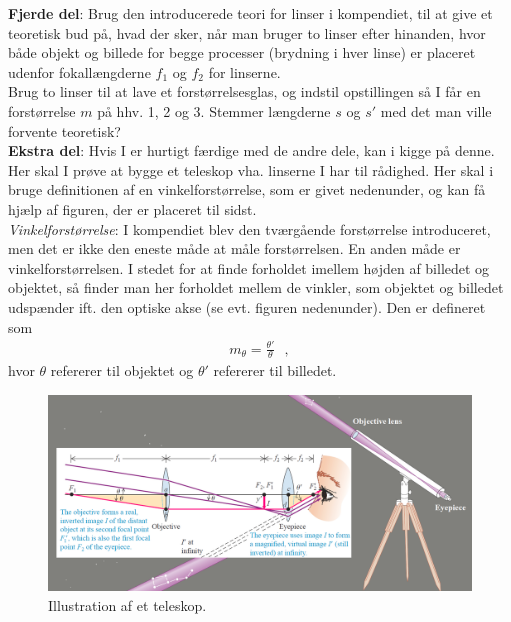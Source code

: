 \documentclass[a4paper,oneside,article,11pt]{memoir}
\begin{document}
\textbf{Fjerde del}:
Brug den introducerede teori for linser i kompendiet, til at give et teoretisk bud på, hvad der sker, når man bruger to linser efter hinanden, hvor både objekt og billede for begge processer (brydning i hver linse) er placeret udenfor fokallængderne $f_1$ og $f_2$ for linserne.\\ 
Brug to linser til at lave et forstørrelsesglas, og indstil opstillingen så I får en forstørrelse $m$ på hhv. 1, 2 og 3. Stemmer længderne $s$ og $s'$ med det man ville forvente teoretisk?\\

\textbf{Ekstra del}:
Hvis I er hurtigt færdige med de andre dele, kan i kigge på denne. Her skal I prøve at bygge et teleskop vha. linserne I har til rådighed. Her skal i bruge definitionen af en vinkelforstørrelse, som er givet nedenunder, og kan få hjælp af figuren, der er placeret til sidst.\\

\emph{Vinkelforstørrelse}: I kompendiet blev den tværgående forstørrelse introduceret, men det er ikke den eneste måde at måle forstørrelsen. En anden måde er vinkelforstørrelsen. I stedet for at finde forholdet imellem højden af billedet og objektet, så finder man her forholdet mellem de vinkler, som objektet og billedet udspænder ift. den optiske akse (se evt. figuren nedenunder). Den er defineret som
\begin{align*}
m_\theta = \frac{\theta'}{\theta} \, \, \, \,  ,
\end{align*}
hvor $\theta$ refererer til objektet og $\theta'$ refererer til billedet.

\begin{figure}[h!]
	\centering
	\includegraphics[scale=0.42]{teleskop-opstilling.png}
	\caption{Illustration af et teleskop.}
\end{figure}
\end{document}
